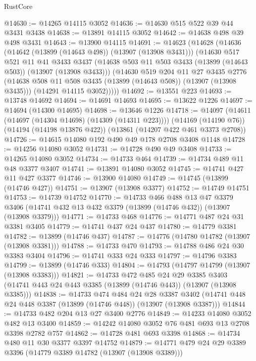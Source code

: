 \begin{lexlean}{RustCore}
\begin{coremodule}
@14630 := @14265 @14115 @3052
@14636 := @14630 @515 @522 @39 @44 @3431 @3438
@14638 := @13891 @14115 @3052
@14642 := @14638 @498 @39 @498 @3431
@14643 := @13900 @14115
@14691 := @14623
    (@14628
      (@14636
        (@14642 (@13899 (@14643 @498)) (@13907 (@13908 @3431)))
        (@14630
          @517
          @521
          @11
          @41
          @3433
          @3437
          (@14638 @503 @11 @503 @3433 (@13899 (@14643 @503)) (@13907 (@13908 @3433)))
          (@14630
            @519
            @204
            @11
            @27
            @3435
            @2776
            (@14638 @508 @11 @508 @3435 (@13899 (@14643 @508)) (@13907 (@13908 @3435)))
            (@14291 @14115 @3052)))))
@14692 := @13551 @223
@14693 := @13748 @14692
@14694 := @14691 @14693
@14695 := @13622 @1226
@14697 := @14694 (@14300 @14695)
@14698 := @13646 @1226
@14718 := @14097
    (@14611 (@14697 (@14304 @14698) (@14309 (@14311 @223))))
    (@14169 (@14190 @76))
    (@14194 (@14198 @13876 @422))
    (@13861 (@14207 @422 @461 @3373 @2708))
@14726 := @14615 @14080 @192 @490 @49 @178 @2708 @3408 @1148
@14728 := @14256 @14080 @3052
@14731 := @14728 @490 @49 @3408
@14733 := @14265 @14080 @3052
@14734 := @14733 @464
@14739 := @14734 @489 @11 @48 @3377 @3407
@14741 := @13891 @14080 @3052
@14745 := @14741 @427 @11 @427 @3377
@14746 := @13900 @14080
@14749 := @14745 (@13899 (@14746 @427))
@14751 := @13907 (@13908 @3377)
@14752 := @14749 @14751
@14753 := @14739 @14752
@14770 := @14733
    @466
    @488
    @13
    @47
    @3379
    @3406
    (@14741 @432 @13 @432 @3379 (@13899 (@14746 @432)) (@13907 (@13908 @3379)))
@14771 := @14733 @468
@14776 := @14771 @487 @24 @31 @3381 @3405
@14779 := @14741 @437 @24 @437
@14780 := @14779 @3381
@14782 := @13899 (@14746 @437)
@14787 := @14776 (@14780 @14782 (@13907 (@13908 @3381)))
@14788 := @14733 @470
@14793 := @14788 @486 @24 @30 @3383 @3404
@14796 := @14741 @333 @24 @333
@14797 := @14796 @3383
@14799 := @13899 (@14746 @333)
@14804 := @14793 (@14797 @14799 (@13907 (@13908 @3383)))
@14821 := @14733
    @472
    @485
    @24
    @29
    @3385
    @3403
    (@14741 @443 @24 @443 @3385 (@13899 (@14746 @443)) (@13907 (@13908 @3385)))
@14838 := @14733
    @474
    @484
    @24
    @28
    @3387
    @3402
    (@14741 @448 @24 @448 @3387 (@13899 (@14746 @448)) (@13907 (@13908 @3387)))
@14844 := @14733 @482 @204 @13 @27 @3400 @2776
@14849 := @14233 @14080 @3052 @482 @13 @3400
@14859 := @14242 @14080 @3052 @76 @481 @693 @13 @2708 @3398 @2782 @757
@14862 := @14728 @481 @693 @3398
@14868 := @14734 @480 @11 @30 @3377 @3397 @14752
@14879 := @14771 @479 @24 @29 @3389 @3396 (@14779 @3389 @14782 (@13907 (@13908 @3389)))

\end{coremodule}
\end{lexlean}
